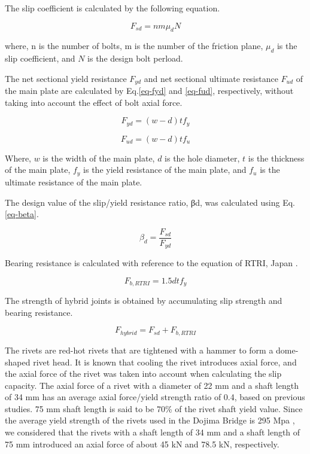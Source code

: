 The slip coefficient is calculated by the following equation.

\begin{equation} \label{eq-fs}
    F_{sd} = n m \mu_d N
\end{equation}

where, n is the number of bolts, m is the number of the friction plane, $\mu_d$ is the slip coefficient, and $N$ is the design bolt perload.

The net sectional yield resistance $F_{yd}$ and net sectional ultimate resistance $F_{ud}$ of the main plate are calculated by Eq.\ref{eq-fyd} and \ref{eq-fud}, respectively, without taking into account the effect of bolt axial force.

\begin{equation}\label{eq-fyd}
    F_{yd} = (w - d) t f_y
\end{equation}

\begin{equation}\label{eq-fud}
    F_{ud} = (w - d) t f_u
\end{equation}

Where, $w$ is the width of the main plate, $d$ is the hole diameter, $t$ is the thickness of the main plate, $f_y$ is the yield resistance of the main plate, and $f_u$ is the ultimate resistance of the main plate.

The design value of the slip/yield resistance ratio, βd, was calculated using Eq. \ref{eq-beta}.

\begin{equation}\label{eq-beta}
    \beta_d = \frac{F_{sd}}{F_{yd}}
\end{equation}

Bearing resistance is calculated with reference to the equation of RTRI, Japan \cite{rtri1992Manual}.

\begin{equation}
    F_{b,RTRI} = 1.5 d t f_y
\end{equation}

The strength of hybrid joints is obtained by accumulating slip strength and bearing resistance.

\begin{equation}
    F_{hybrid} = F_{sd} + F_{b,RTRI}
\end{equation}

The rivets are red-hot rivets that are tightened with a hammer to form a dome-shaped rivet head. It is known that cooling the rivet introduces axial force, and the axial force of the rivet was taken into account when calculating the slip capacity. The axial force of a rivet with a diameter of 22 mm and a shaft length of 34 mm has an average axial force/yield strength ratio of 0.4, based on previous studies. 75 mm shaft length is said to be 70\% of the rivet shaft yield value. Since the average yield strength of the rivets used in the Dojima Bridge is 295 Mpa , we considered that the rivets with a shaft length of 34 mm and a shaft length of 75 mm introduced an axial force of about 45 kN and 78.5 kN, respectively.

